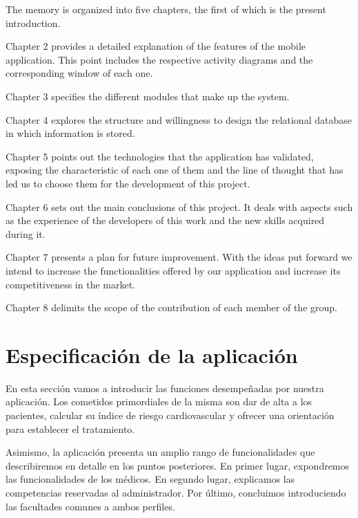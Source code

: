 \documentclass[11pt,spanish,
		listoftables,listoffigures]
		{tfgplantilla}
\begin{document}
The memory is organized into five chapters, the first of which is the present introduction.

Chapter 2 provides a detailed explanation of the features of the mobile application. This point includes the respective activity diagrams and the corresponding window of each one.

Chapter 3 specifies the different modules that make up the system.

Chapter 4 explores the structure and willingness to design the relational database in which information is stored.

Chapter 5 points out the technologies that the application has validated, exposing the characteristic of each one of them and the line of thought that has led us to choose them for the development of this project.

Chapter 6 sets out the main conclusions of this project. It deals with aspects such as the experience of the developers of this work and the new skills acquired during it.

Chapter 7 presents a plan for future improvement. With the ideas put forward we intend to increase the functionalities offered by our application and increase its competitiveness in the market.

Chapter 8 delimits the scope of the contribution of each member of the group.


\chapter{Especificación de la aplicaci\'on}

En esta sección vamos a introducir las funciones desempeñadas por nuestra aplicación. Los cometidos primordiales de la misma son dar de alta a los pacientes, calcular su índice de riesgo cardiovascular y ofrecer una orientación para establecer el tratamiento.

Asimismo, la aplicación presenta un amplio rango de funcionalidades que describiremos en detalle en los puntos posteriores. En primer lugar, expondremos las funcionalidades de los médicos. En segundo lugar, explicamos las competencias reservadas al administrador. 
Por último, concluimos introduciendo las facultades comunes a ambos perfiles.
\end{document}
